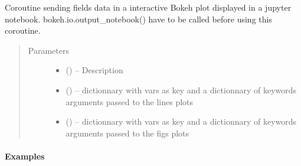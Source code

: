 \documentclass[letterpaper,10pt,english]{sphinxmanual}
\begin{document}
\begin{fulllineitems}
\label{\detokenize{triflow.plugins:triflow.plugins.displays.bokeh_fields_update}}
Coroutine sending fields data in a interactive Bokeh plot displayed in
a jupyter notebook.
bokeh.io.output\_notebook() have to be called before using this coroutine.
\begin{quote}\begin{description}
\item[{Parameters}] \leavevmode\begin{itemize}
\item {} 
 (\sphinxstyleliteralemphasis{, }) -- Description

\item {} 
 () -- dictionnary with vars as key and a dictionnary of keywords arguments passed to the lines plots

\item {} 
 () -- dictionnary with vars as key and a dictionnary of keywords arguments passed to the figs plots

\end{itemize}

\end{description}\end{quote}
\paragraph{Examples}

\begin{sphinxVerbatim}[commandchars=\\\{\}]
     
   
\end{sphinxVerbatim}

\begin{sphinxVerbatim}[commandchars=\\\{\}]
   
  
\end{sphinxVerbatim}


\end{fulllineitems}
\end{document}
